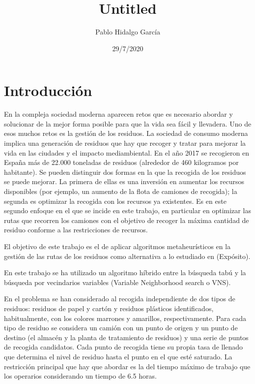 \documentclass[
]{article}
\title{Untitled}
\author{Pablo Hidalgo García}
\date{29/7/2020}
\begin{document}
\maketitle

\hypertarget{introducciuxf3n}{%
\section{Introducción}\label{introducciuxf3n}}

En la compleja sociedad moderna aparecen retos que es necesario abordar
y solucionar de la mejor forma posible para que la vida sea fácil y
llevadera. Uno de esos muchos retos es la gestión de los residuos. La
sociedad de consumo moderna implica una generación de residuos que hay
que recoger y tratar para mejorar la vida en las ciudades y el impacto
mediambiental. En el año 2017 se recogieron en España más de 22.000
toneladas de residuos (alrededor de 460 kilogramos por habitante). Se
pueden distinguir dos formas en la que la recogida de los residuos se
puede mejorar. La primera de ellas es una inversión en aumentar los
recursos disponibles (por ejemplo, un aumento de la flota de camiones de
recogida); la segunda es optimizar la recogida con los recursos ya
existentes. Es en este segundo enfoque en el que se incide en este
trabajo, en particular en optimizar las rutas que recorren los camiones
con el objetivo de recoger la máxima cantidad de residuo conforme a las
restricciones de recursos.

El objetivo de este trabajo es el de aplicar algoritmos metaheurísticos
en la gestión de las rutas de los residuos como alternativa a lo
estudiado en (Expósito).

En este trabajo se ha utilizado un algoritmo híbrido entre la búsqueda
tabú y la búsqueda por vecindarios variables (Variable Neighborhood
search o VNS).

En el problema se han considerado al recogida independiente de dos tipos
de residuos: residuos de papel y cartón y residuos plásticos
identificados, habitualmente, con los colores marrones y amarillos,
respectivamente. Para cada tipo de residuo se considera un camión con un
punto de origen y un punto de destino (el almacén y la planta de
tratamiento de residuos) y una serie de puntos de recogida candidatos.
Cada punto de recogida tiene su propia tasa de llenado que determina el
nivel de residuo hasta el punto en el que esté saturado. La restricción
principal que hay que abordar es la del tiempo máximo de trabajo que los
operarios considerando un tiempo de 6.5 horas.
\end{document}
